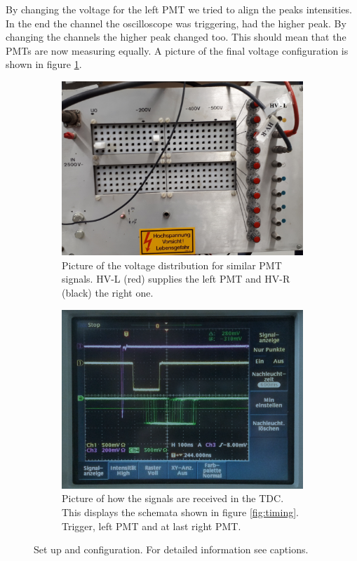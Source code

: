 \documentclass[]{article}
\begin{document}
By changing the voltage for the left PMT we tried to align the peaks intensities. In the end the channel the oscilloscope was triggering, had the higher peak. By changing the channels the higher peak changed too. This should mean that the PMTs are now measuring equally. A picture of the final voltage configuration is shown in figure \ref{fig:voltage}.

\begin{figure}[H]
\centering
\begin{subfigure}{0.45\textwidth}
\centering
\includegraphics[width=\linewidth]{Plots/Spannung.jpg}
\caption{Picture of the voltage distribution for similar PMT signals. HV-L (red) supplies the left PMT and HV-R (black) the right one.}
\label{fig:voltage}
\end{subfigure}
\begin{subfigure}{0.45\textwidth}
\centering
\includegraphics[width=\linewidth]{Plots/SignalOrder.png}
\caption{Picture of how the signals are received in the TDC. This displays the schemata shown in figure \ref{fig:timing}. Trigger, left PMT and at last right PMT. }
\label{fig:signal order}
\end{subfigure}
\caption{Set up and configuration. For detailed information see captions.}
\end{figure}
\end{document}
